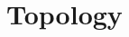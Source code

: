 \documentclass[10pt,a4paper]{extreport}
\begin{document}
\part{Topology}\label{part:topology}


%

%
%
%
%

%

%
\pagebreak

\printbibliography[title={Bibliography}]

\end{document}
